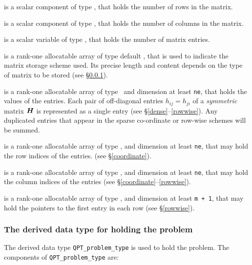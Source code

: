 \documentclass{galahad}
\begin{document}
\begin{description}

 is a scalar component of type \integer, 
that holds the number of rows in the matrix. 
 
 is a scalar component of type \integer, 
that holds the number of columns in the matrix. 
 
 is a scalar variable of type \integer, that
holds the number of matrix entries.

 is a rank-one allocatable array of type default \character, that
is used to indicate the matrix storage scheme used. Its precise length and
content depends on the type of matrix to be stored (see \S\ref{typeprob}).

 is a rank-one allocatable array of type \realdp\, 
and dimension at least {\tt ne}, that holds the values of the entries. 
Each pair of off-diagonal entries $h_{ij} = h_{ji}$ of a {\em symmetric}
matrix ${\bm{H}}$ is represented as a single entry 
(see \S\ref{dense}--\ref{rowwise}).
Any duplicated entries that appear in the sparse 
co-ordinate or row-wise schemes will be summed. 

 is a rank-one allocatable array of type \integer, 
and dimension at least {\tt ne}, that may hold the row indices of the entries. 
(see \S\ref{coordinate}).

 is a rank-one allocatable array of type \integer, 
and dimension at least {\tt ne}, that may hold the column indices of the entries
(see \S\ref{coordinate}--\ref{rowwise}).

 is a rank-one allocatable array of type \integer, 
and dimension at least {\tt m + 1}, that may hold the pointers to
the first entry in each row (see \S\ref{rowwise}).

\end{description}


\subsubsection{The derived data type for holding the problem}\label{typeprob}
The derived data type {\tt QPT\_problem\_type} is used to hold 
the problem. The components of 
{\tt QPT\_problem\_type} 
are:
\end{document}
